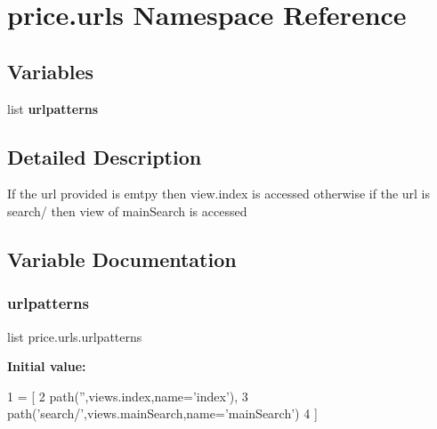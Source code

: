 \hypertarget{namespaceprice_1_1urls}{}\section{price.\+urls Namespace Reference}
\label{namespaceprice_1_1urls}
\subsection*{Variables}
\begin{DoxyCompactItemize}
\item 
list {\bfseries urlpatterns}
\end{DoxyCompactItemize}


\subsection{Detailed Description}
\begin{DoxyVerb}If the url provided is emtpy then view.index is accessed otherwise if the url is search/ then view of mainSearch is accessed
\end{DoxyVerb}
 

\subsection{Variable Documentation}
\mbox{\label{namespaceprice_1_1urls_a27b2f25314bfaa12f15a15d1636ba8e6}} 
\subsubsection{\texorpdfstring{urlpatterns}{urlpatterns}}
{\footnotesize\ttfamily list price.\+urls.\+urlpatterns}

{\bfseries Initial value\+:}
\begin{DoxyCode}
1 = [
2     path(\textcolor{stringliteral}{''},views.index,name=\textcolor{stringliteral}{'index'}),
3     path(\textcolor{stringliteral}{'search/'},views.mainSearch,name=\textcolor{stringliteral}{'mainSearch'})
4 ]
\end{DoxyCode}

